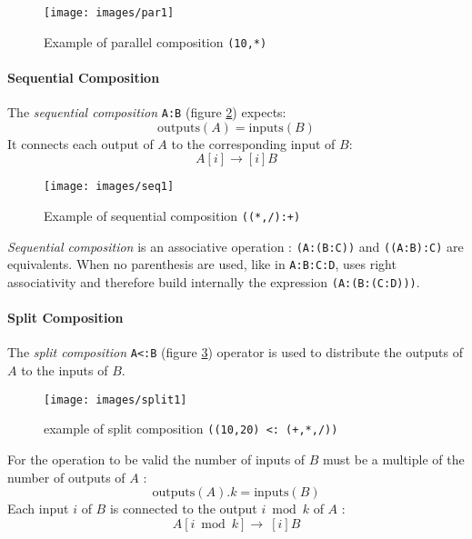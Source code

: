 \begin{figure}[h]
\centering
\texttt{[image: images/par1]}
\caption{Example of parallel composition  \lstinline'(10,*)'}
\label{figure:par1}
\end{figure}


\paragraph{Sequential Composition}
The \emph{sequential composition}  \lstinline$A:B$ (figure \ref{figure:seq1}) expects:
\begin{equation}
\mathrm{outputs}(A)=\mathrm{inputs}(B)
\end{equation}  
It connects each output of  $A$ to the corresponding input of $B$: 
\begin{equation}
A[i]\rightarrow[i]B
\end{equation}  

\begin{figure}[h]
\centering 
\texttt{[image: images/seq1]}
\caption{Example of sequential composition  \lstinline'((*,/):+)' } 
\label{figure:seq1}
\end{figure}

\emph{Sequential composition} is an associative operation : \lstinline$(A:(B:C))$ and \lstinline$((A:B):C)$ are equivalents. When no parenthesis are used, like in \lstinline$A:B:C:D$, \faust uses right associativity and therefore build internally the expression \lstinline$(A:(B:(C:D)))$.

\paragraph{Split Composition}
The \emph{split composition}  \lstinline$A<:B$ (figure \ref{figure:split1}) operator is used to distribute the outputs
of $A$ to the inputs of $B$.

\begin{figure}[h]
\centering 
\texttt{[image: images/split1]} 
\caption{example of split composition   \lstinline'((10,20) <: (+,*,/))'}  
\label{figure:split1}
\end{figure}

For the operation to be valid the number of inputs of $B$ must be a multiple of the number of outputs of $A$ : \begin{equation}
\mathrm{outputs}(A).k=\mathrm{inputs}(B)                                                                                                                                                         \end{equation}
Each input $i$ of $B$ is connected to the output $i \bmod k$ of $A$ : 
\begin{equation}
A[i \bmod k]\rightarrow\ [i]B                                                                                                                                                                                                                                                                                                                       \end{equation}


